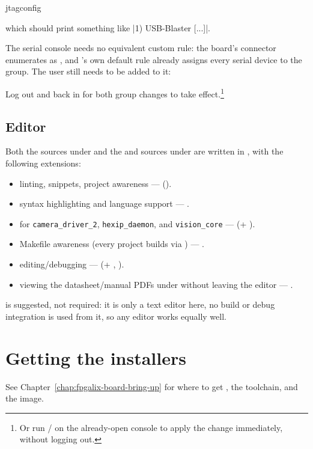 \begin{shellcodehost}
jtagconfig
\end{shellcodehost}

which should print something like |1) USB-Blaster [...]|.

The serial console needs no equivalent custom rule: the board's  connector enumerates as , and 's own default rule already assigns every serial device to the  group. The user still needs to be added to it:


Log out and back in for both group changes to take effect.\footnote{Or run  /  on the already-open console to apply the change immediately, without logging out.}

\subsection{Editor}

Both the  sources under  and the  and  sources under  are written in , with the following extensions:

{\footnotesize
\begin{itemize}
    \item {} linting, snippets, project awareness ---  ().
    \item {} syntax highlighting and language support --- .
    \item {}  for \texttt{camera\_driver\_2}, \texttt{hexip\_daemon}, and \texttt{vision\_core} ---  (+ ).
    \item Makefile awareness (every  project builds via ) --- .
    \item editing/debugging  ---  (+ , ).
    \item viewing the datasheet/manual PDFs under  without leaving the editor --- .
\end{itemize}
}

 is suggested, not required: it is only a text editor here, no build or debug integration is used from it, so any editor works equally well.

\section{Getting the installers}

See Chapter~\ref{chap:fpgalix-board-bring-up} for where to get , the  toolchain, and the  image.
